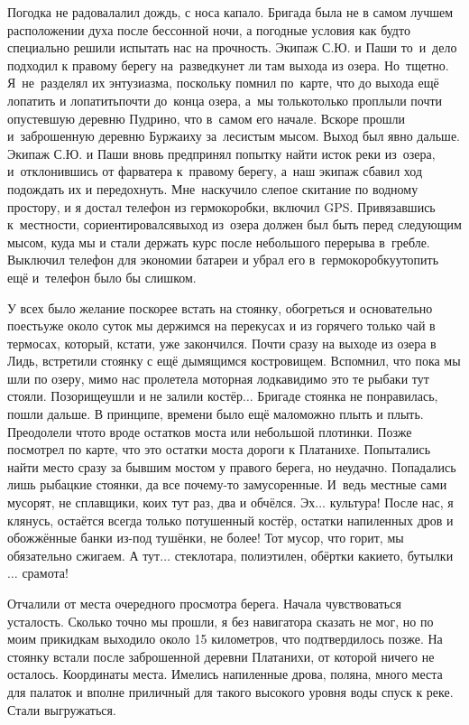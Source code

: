 Погодка не радовала\mdash лил дождь, с носа капало. Бригада была не в самом лучшем расположении духа после бессонной ночи, а погодные условия как будто специально решили испытать нас на прочность. Экипаж С.Ю. и Паши то~и~дело подходил к правому берегу на~разведку\mdash нет ли там выхода из озера. Но~тщетно. Я~не~разделял их энтузиазма, поскольку помнил по~карте, что до выхода ещё лопатить и лопатить\mdash почти до~конца озера, а~мы только\sdash только проплыли почти опустевшую деревню Пудрино, что в~самом его начале. Вскоре прошли и~заброшенную деревню Буржаиху за~лесистым мысом. Выход был явно дальше. Экипаж С.Ю. и Паши вновь предпринял попытку найти исток реки из~озера, и~отклонившись от фарватера к~правому берегу, а~наш экипаж сбавил ход подождать их и передохнуть. Мне~наскучило слепое скитание по водному простору, и я достал телефон из гермокоробки, включил GPS. Привязавшись к~местности, сориентировался\mdash выход из~озера должен был быть перед следующим мысом, куда мы и стали держать курс после небольшого перерыва в~гребле. Выключил телефон для экономии батареи и убрал его в~гермокоробку\mdash утопить ещё и~телефон было бы слишком.

У всех было желание поскорее встать на стоянку, обогреться и основательно поесть\mdash уже около суток мы держимся на перекусах и из горячего только чай в термосах, который, кстати, уже закончился. Почти сразу на выходе из озера в Лидь, встретили стоянку с ещё дымящимся костровищем. Вспомнил, что пока мы шли по озеру, мимо нас пролетела моторная лодка\mdash видимо это те рыбаки тут стояли. Позорище\mdash ушли и не залили костёр$\ldots$ Бригаде стоянка не понравилась, пошли дальше. В принципе, времени было ещё мало\mdash можно плыть и плыть. Преодолели что\sdash то вроде остатков моста или небольшой плотинки. Позже посмотрел по карте, что это остатки моста дороги к Платанихе. Попытались найти место сразу за бывшим мостом у правого берега, но неудачно. Попадались лишь рыбацкие стоянки, да все почему-то замусоренные. И~ведь местные сами мусорят, не сплавщики, коих тут раз, два и обчёлся. Эх$\ldots$ культура! После нас, я клянусь, остаётся всегда только потушенный костёр, остатки напиленных дров и обожжённые банки из-под тушёнки, не более! Тот мусор, что горит, мы обязательно сжигаем. А тут$\ldots$ стеклотара, полиэтилен, обёртки какие\sdash то, бутылки$\ldots$ срамота! 

Отчалили от места очередного просмотра берега. Начала чувствоваться усталость. Сколько точно мы прошли, я без навигатора сказать не мог, но по моим прикидкам выходило около 15 километров, что подтвердилось позже. На стоянку встали после заброшенной деревни Платанихи, от которой ничего не осталось. Координаты места\mdash \CoordsLidSeventeenFirst. Имелись напиленные дрова, поляна, много места для палаток и вполне приличный для такого высокого уровня воды спуск к реке. Стали выгружаться. 

